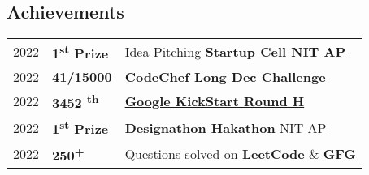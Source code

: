 \documentclass[]{article}
\begin{document}
\begin{multicols}{2}
\begin{flushleft}
    \section*{Achievements} 
    \begin{tabular}{rll}
    2022	  &  \textbf{1\textsuperscript{st} Prize} & \href{https://drive.google.com/drive/folders/13uV6u1qge0kMAJ67J84DtnbJjgjbHjSGtBizGmAzotTOa0BFClvEWlYaDQQeQMJbOVtBXxCk}{Idea Pitching \textbf{Startup Cell NIT AP}} \\
    2022	     & \textbf{ 41/15000}  & \href{https://drive.google.com/file/d/1atilxo1LnxKXvUW8hDytg__F1Dpe0FDC/view}{\textbf{CodeChef Long Dec Challenge}}\\
    2022  & \textbf{3452 \textsuperscript{th}} & \href{https://drive.google.com/file/d/1BiwyVlzI5dh4EW5C9SVCS4j_vrKi3bdd/view}{\textbf{Google KickStart Round H}}\\
    2022	     &  \textbf{1\textsuperscript{st} Prize} & \href{https://drive.google.com/file/d/11MtJKzNPpVAdR6VWHuizrE2ros0bHbOS/view}{ \textbf{Designathon Hakathon} NIT AP} \\
    2022 & \textbf{ 250\textsuperscript{+}} & Questions solved on \href{https://auth.geeksforgeeks.org/user/rahulsah6003/practice/}{\textbf{LeetCode}} \& \href{https://leetcode.com/rahulsah6003/}{\textbf{GFG}}
    \end{tabular}


  \end{flushleft}



\end{multicols}
\end{document}
